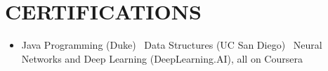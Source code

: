 \documentclass[11pt,a4paper]{article}
\begin{document}

\section{CERTIFICATIONS}

\begin{itemize}[leftmargin=0pt]

\item[]\small{Java Programming (Duke) \textbar\ Data Structures (UC San Diego) \textbar\ Neural Networks and Deep Learning (DeepLearning.AI), all on Coursera}

\end{itemize}
\end{document}
